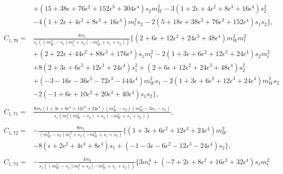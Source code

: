 \documentclass[twocolumn,aps,showpacs,nofootinbib,superscriptaddress,prd]{revtex4-2}
\begin{document}
\begin{widetext}
\begin{align}
\nonumber\\&
+\left(15 +38 \epsilon +76 \epsilon^2 +152 \epsilon^3 +304 \epsilon^4\right)s_2m_W^2-3\left(1 +2 \epsilon +4 \epsilon^2 +8 \epsilon^3 +16 \epsilon^4\right)s_2^2
\nonumber\\&
-4\left(1 +2 \epsilon +4 \epsilon^2 +8 \epsilon^3 +16 \epsilon^4\right)m_t^2s_2-2\left(5 +18 \epsilon +38 \epsilon^2 +76 \epsilon^3 +152 \epsilon^4\right)s_1s_2\}
,\nonumber\\
\nonumber\\
C_{1,70}=&\frac{4m_t}{s_1\left(\left(m_W^2-s_2\right)m_t^2+s_2\left(-m_W^2+s_1+s_2\right)\right)}\{\left(2 +6 \epsilon +12 \epsilon^2 +24 \epsilon^3 +48 \epsilon^4\right)m_W^2m_t^2
\nonumber\\&
+\left(2 +22 \epsilon +44 \epsilon^2 +88 \epsilon^3 +176 \epsilon^4\right)s_1m_t^2-2\left(1 +3 \epsilon +6 \epsilon^2 +12 \epsilon^3 +24 \epsilon^4\right)s_2m_t^2
\nonumber\\&
+8\left(2 +3 \epsilon +6 \epsilon^2 +12 \epsilon^3 +24 \epsilon^4\right)s_1^2+\left(2 +6 \epsilon +12 \epsilon^2 +24 \epsilon^3 +48 \epsilon^4\right)s_2^2
\nonumber\\&
+\left(-3 -16 \epsilon -36 \epsilon^2 -72 \epsilon^3 -144 \epsilon^4\right)m_W^2s_1-2\left(1 +3 \epsilon +6 \epsilon^2 +12 \epsilon^3 +24 \epsilon^4\right)m_W^2s_2
\nonumber\\&
-2\left(-1 +6 \epsilon +10 \epsilon^2 +20 \epsilon^3 +40 \epsilon^4\right)s_1s_2\}
,\nonumber\\
\nonumber\\
C_{1,71}=&\frac{8m_t\left(1 +3 \epsilon +6 \epsilon^2 +12 \epsilon^3 +24 \epsilon^4\right)\left(m_W^2-s_2\right)\left(m_W^2-3
s_1-s_2\right)}{s_1\left(m_t^2\left(m_W^2-s_2\right)+s_2\left(-m_W^2+s_1+s_2\right)\right)}
,\nonumber\\
\nonumber\\
C_{1,72}=&-\frac{8m_t}{\left(m_W^2-s_2\right)m_t^2+s_2\left(-m_W^2+s_1+s_2\right)}\{\left(1 +3 \epsilon +6 \epsilon^2 +12 \epsilon^3 +24 \epsilon^4\right)m_W^2
\nonumber\\&
-8\left(\epsilon +2 \epsilon^2 +4 \epsilon^3 +8 \epsilon^4\right)s_1+\left(-1 -3 \epsilon -6 \epsilon^2 -12 \epsilon^3 -24 \epsilon^4\right)s_2\}
,\nonumber\\
\nonumber\\
C_{1,73}=&-\frac{4m_t}{s_1\left(\left(m_W^2-s_2\right)m_t^2+s_2\left(-m_W^2+s_1+s_2\right)\right)}\{3m_t^4+\left(-7 +2 \epsilon +8 \epsilon^2 +16 \epsilon^3 +32 \epsilon^4\right)s_1m_t^2
\nonumber\\&

\end{align}
\end{widetext}
\end{document}
